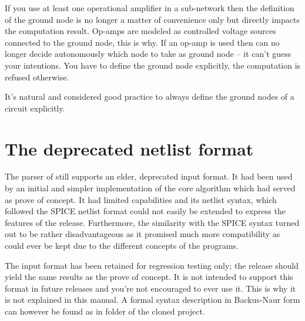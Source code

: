 If you use at least one operational amplifier in a sub-network then the
definition of the ground node is no longer a matter of convenience only
but directly impacts the computation result. Op-amps are modeled as
controlled voltage sources connected to the ground node, this is why. If
an op-amp is used then \linnet{} can no longer decide autonomously which
node to take as ground node -- it can't guess your intentions. You have to
define the ground node explicitly, the computation is refused otherwise.

It's natural and considered good practice to always define the ground
nodes of a circuit explicitly.


\section{The deprecated netlist format }

The parser of \linnet{} still supports an elder, deprecated input format.
It had been used by an initial and simpler implementation of the core
algorithm which had served as prove of concept. It had limited
capabilities and its netlist syntax, which followed the SPICE netlist
format could not easily be extended to express the features of the
\linnet{} release. Furthermore, the similarity with the SPICE syntax turned
out to be rather disadvantageous as it promised much more compatibility
as could ever be kept due to the different concepts of the programs.

The  input format has been retained for regression testing
only; the \linnet{} release should yield the same results as the prove of
concept. It is not intended to support this format in future releases and
you're not encouraged to ever use it. This is why it is not explained in
this manual. A formal syntax description in Backus-Naur form can however
be found as  in folder  of the cloned
project.

